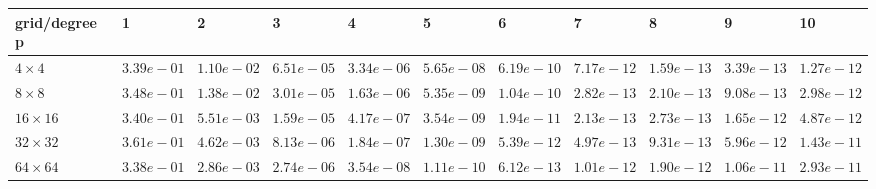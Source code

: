 \begin{tabular}{lllllllllll}
\hline
 grid/degree p   & 1          & 2          & 3          & 4          & 5          & 6          & 7          & 8          & 9          & 10         \\
\hline
 $4 \times 4$    & $3.39e-01$ & $1.10e-02$ & $6.51e-05$ & $3.34e-06$ & $5.65e-08$ & $6.19e-10$ & $7.17e-12$ & $1.59e-13$ & $3.39e-13$ & $1.27e-12$ \\
 $8 \times 8$    & $3.48e-01$ & $1.38e-02$ & $3.01e-05$ & $1.63e-06$ & $5.35e-09$ & $1.04e-10$ & $2.82e-13$ & $2.10e-13$ & $9.08e-13$ & $2.98e-12$ \\
 $16 \times 16$  & $3.40e-01$ & $5.51e-03$ & $1.59e-05$ & $4.17e-07$ & $3.54e-09$ & $1.94e-11$ & $2.13e-13$ & $2.73e-13$ & $1.65e-12$ & $4.87e-12$ \\
 $32 \times 32$  & $3.61e-01$ & $4.62e-03$ & $8.13e-06$ & $1.84e-07$ & $1.30e-09$ & $5.39e-12$ & $4.97e-13$ & $9.31e-13$ & $5.96e-12$ & $1.43e-11$ \\
 $64 \times 64$  & $3.38e-01$ & $2.86e-03$ & $2.74e-06$ & $3.54e-08$ & $1.11e-10$ & $6.12e-13$ & $1.01e-12$ & $1.90e-12$ & $1.06e-11$ & $2.93e-11$ \\
\hline
\end{tabular}
